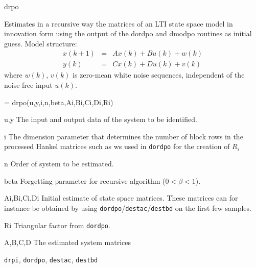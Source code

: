 \documentclass{book}
\newcommand{\destbd}{\texttt{destbd}}
\newcommand{\dordpo}{\texttt{dordpo}}
\newcommand{\destac}{\texttt{destac}}
\newcommand{\drpi}{\texttt{drpi}}
\begin{document}
\begin{command}{drpo}
\begin{purpose}
  Estimates in a recursive way the matrices of an LTI state space
  model in innovation form using the output of the dordpo and dmodpo
  routines as initial guess.
  Model structure:
  \begin{eqnarray*}
    x(k+1) & = &  A x(k) + B u(k) +w(k)\\
    y(k) & = & C x(k) + D u(k) + v(k)
  \end{eqnarray*}
  where $w(k)$, $v(k)$ is zero-mean white noise sequences, independent
  of the noise-free input $u(k)$.
\end{purpose}

\begin{syntax}
[A,B,C,D]= drpo(u,y,i,n,beta,Ai,Bi,Ci,Di,Ri)
\end{syntax}

\begin{inputs}
  \item[u,y] The input and output data of the system to be identified.
  \item[i] The dimension parameter that determines the number of block
    rows in the processed Hankel matrices such as ws used in {\dordpo}
    for the creation of $R_i$
  \item[n] Order of system to be estimated.
  \item[beta] Forgetting parameter for recursive algorithm ($0 < \beta < 1$).
  \item[Ai,Bi,Ci,Di] Initial estimate of state space matrices.  These
    matrices can for instance be obtained by using
    {\dordpo}/{\destac}/{\destbd} on the first few samples.
  \item[Ri] Triangular factor from {\dordpo}.
 \end{inputs}

\begin{outputs}
  \item[A,B,C,D] The estimated system matrices\\
\end{outputs}
          
\begin{seealso}
{\drpi}, {\dordpo}, {\destac}, {\destbd}
\end{seealso}
\end{command}%
\end{document}
